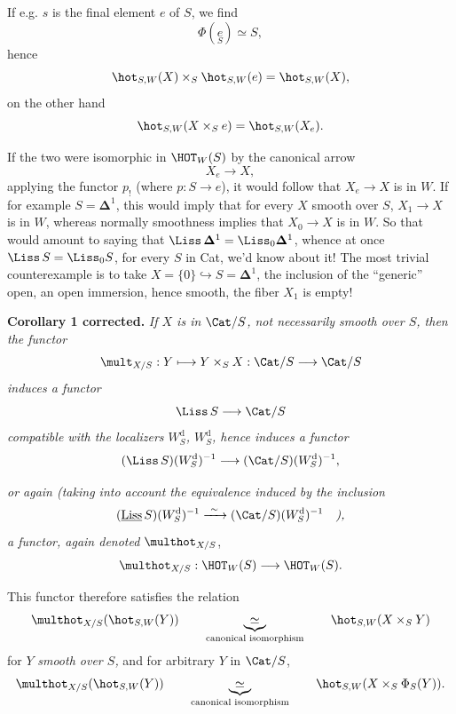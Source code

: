 If e.g. $s$ is the final element $e$ of $S$, we find
\[\Phi(\underset{S}{e}) \simeq S,\]
hence
\[\hot_{S,W}(X)\times_S \hot_{S,W}(e)=\hot_{S,W}(X),\]
on the other hand
\[\hot_{S,W}(X\times_S e)=\hot_{S,W}(X_e).\]

If the two were isomorphic in $\HOT_W(S)$ by the canonical arrow
\[X_e\longrightarrow X,\]
applying the functor $p_!$ (where $p : S\longrightarrow e$), it would follow that $X_e\longrightarrow X$ is in $W$. If for example $S=\mathbf{\Delta}^1$, this would imply that for every $X$ smooth over $S$, $X_1\longrightarrow X$ is in $W$, whereas normally smoothness implies that $X_0\longrightarrow X$ is in $W$. So that would amount to saying that $\Liss\,\mathbf{\Delta}^1=\Liss_0\mathbf{\Delta}^1$, whence at once $\Liss\,S=\Liss_0S$, for every $S$ in Cat, we'd know about it! The most trivial counterexample is to take $X=\{0\}\hookrightarrow S=\mathbf{\Delta}^1$, the inclusion of the ``generic'' open, an open immersion, hence smooth, the fiber $X_1$ is empty! %

\textbf{Corollary 1 corrected.} \textit{If $X$ is in} $\Cat/S$\textit{, not necessarily smooth over $S$, then the functor}
\[\mult_{X/S} : Y\longmapsto Y\times_S X : \Cat/S\longrightarrow \Cat/S\]
\textit{induces a functor}
\[\Liss\,S\longrightarrow \Cat/S\]
\textit{compatible with the localizers $W_S^{\mathrm{d}}$, $W_S^{\mathrm{d}}$, hence induces a functor}
\[(\Liss\,S)(W_S^{\mathrm{d}})^{-1}\longrightarrow(\Cat/S)(W_S^{\mathrm{d}})^{-1},\]

\textit{or again (taking into account the equivalence induced by the inclusion}
\[(\underline{\mathrm{Liss}}\,S)(W_S^{\mathrm{d}})^{-1}\xrightarrow{\ \sim\ }(\Cat/S)(W_S^{\mathrm{d}})^{-1}\quad\textit{),}\] %
\textit{a functor, again denoted} $\multhot_{X/S}$,
\[\multhot_{X/S} : \HOT_W(S)\longrightarrow\HOT_W(S).\]

This functor therefore satisfies the relation
\[\multhot_{X/S}(\hot_{S,W}(Y))\qquad\underbrace{\ \simeq\ }_{\text{canonical isomorphism}}\qquad\hot_{S,W}(X\times_S Y)\]
for $Y$ \textit{smooth over $S$,} and for arbitrary $Y$ in $\Cat/S$,
\[\multhot_{X/S}(\hot_{S,W}(Y))\qquad\underbrace{\ \simeq\ }_{\text{canonical isomorphism}}\qquad\hot_{S,W}(X\times_S \Phi_S(Y)).\]

